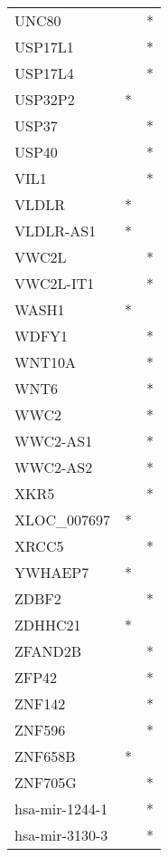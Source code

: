 \begin{longtable}{lcc}
UNC80          &           &       * \\
USP17L1        &           &       * \\
USP17L4        &           &       * \\
USP32P2        &         * &         \\
USP37          &           &       * \\
USP40          &           &       * \\
VIL1           &           &       * \\
VLDLR          &         * &         \\
VLDLR-AS1      &         * &         \\
VWC2L          &           &       * \\
VWC2L-IT1      &           &       * \\
WASH1          &         * &         \\
WDFY1          &           &       * \\
WNT10A         &           &       * \\
WNT6           &           &       * \\
WWC2           &           &       * \\
WWC2-AS1       &           &       * \\
WWC2-AS2       &           &       * \\
XKR5           &           &       * \\
XLOC\_007697    &         * &         \\
XRCC5          &           &       * \\
YWHAEP7        &         * &         \\
ZDBF2          &           &       * \\
ZDHHC21        &         * &         \\
ZFAND2B        &           &       * \\
ZFP42          &           &       * \\
ZNF142         &           &       * \\
ZNF596         &           &       * \\
ZNF658B        &         * &         \\
ZNF705G        &           &       * \\
hsa-mir-1244-1 &           &       * \\
hsa-mir-3130-3 &           &       * \\
\end{longtable}

